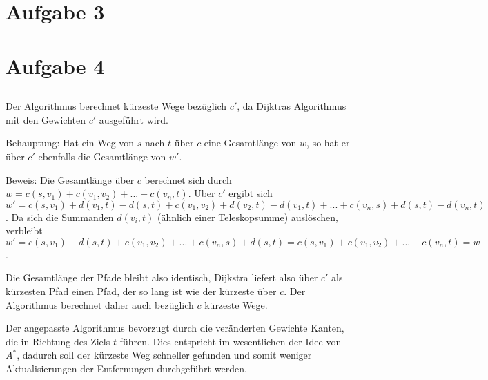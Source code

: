 \documentclass[a4paper]{article}
\begin{document}
\section{Aufgabe 3}

\section{Aufgabe 4}

\subsection{}
Der Algorithmus berechnet kürzeste Wege bezüglich $c'$, da Dijktras
Algorithmus mit den Gewichten $c'$ ausgeführt wird.

Behauptung: Hat ein Weg von $s$ nach $t$ über $c$ eine Gesamtlänge von $w$,
so hat er über $c'$ ebenfalls die Gesamtlänge von $w'$.

Beweis: Die Gesamtlänge über $c$ berechnet sich durch $w = c(s, v_1) +
c(v_1, v_2) + ... + c(v_n, t)$. Über $c'$ ergibt sich $w' = c(s, v_1) +
d(v_1, t) - d(s, t) + c(v_1, v_2) + d(v_2, t) - d(v_1, t) + ... + c(v_n, s)
+ d(s, t) - d(v_n, t)$. Da sich die Summanden $d(v_i, t)$ (ähnlich einer
Teleskopsumme) auslöschen, verbleibt $w' = c(s, v_1) - d(s, t) + c(v_1, v_2)
+ ... + c(v_n, s) + d(s, t) = c(s, v_1) + c(v_1, v_2) + ... + c(v_n, t) = w$.

Die Gesamtlänge der Pfade bleibt also identisch, Dijkstra liefert also über
$c'$ als kürzesten Pfad einen Pfad, der so lang ist wie der kürzeste über
$c$. Der Algorithmus berechnet daher auch bezüglich $c$ kürzeste Wege.

Der angepasste Algorithmus bevorzugt durch die veränderten Gewichte Kanten,
die in Richtung des Ziels $t$ führen. Dies entspricht im wesentlichen der
Idee von $A^*$, dadurch soll der kürzeste Weg schneller gefunden und somit
weniger Aktualisierungen der Entfernungen durchgeführt werden.

\subsection{}
\end{document}
